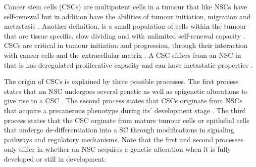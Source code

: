 \documentclass[\main/thesis.tex]{subfiles}
\begin{document}
Cancer stem cells (CSCs) are multipotent cells in a tumour that like NSCs have 
self-renewal but in addition have the abilities of tumour initiation, migration 
and metastasis \parencite{Biddle,Bu}. Another definition, is a small population 
of cells within the tumour that are tissue specific, slow dividing and with 
unlimited self-renewal capacity \parencite{Cabanillas}. CSCs are critical in 
tumour initiation and progression, through their interaction with cancer cells 
and the extracellular matrix \parencite{Catalano}. A CSC differs from an NSC in 
that is has deregulated proliferative capacity and can have metastatic 
properties \parencite{Cabanillas,Zhou}. 

The origin of CSCs is explained by three possible processes. The first process 
states that an NSC undergoes several genetic as well as epigenetic alterations 
to give rise to a CSC \parencite{Feller}. The second process states that CSCs 
originate from NSCs that acquire a precanerous phenotype during its' 
development stage \parencite{Bjerkvig,Feller,GonzalezMoles}. The third process 
states that the CSC orginate from mature tumour cells 
\parencite{DiFiore,HerrerosVillanueva,Kumar,Moon} or epithelial cells 
\parencite{Bjerkvig,Feller,GonzalezMoles} that undergo de-differentiation into 
a SC through modifications in signaling pathways and regulatory mechanisms. 
Note that the first and second processes only differ in whether an NSC acquires 
a genetic alteration when it is fully developed or still in development.
\end{document}
